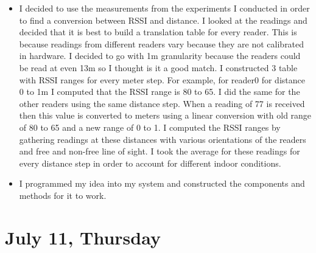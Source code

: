 \documentclass[a4paper,12pt]{article}
\begin{document}
\begin{itemize}
	\item I decided to use the measurements from the experiments I conducted in order to find a conversion between RSSI and distance. I looked at the readings and decided that it is best to build a translation table for every reader. This is because readings from different readers vary because they are not calibrated in hardware. I decided to go with 1m granularity because the readers could be read at even 13m so I thought is it a good match. I constructed 3 table with RSSI ranges for every meter step. For example, for reader0 for distance 0 to 1m I computed that the RSSI range is 80 to 65. I did the same for the other readers using the same distance step. When a reading of 77 is received then this value is converted to meters using a linear conversion with old range of 80 to 65 and a new range of 0 to 1. I computed the RSSI ranges by gathering readings at these distances with various orientations of the readers and free and non-free line of sight. I took the average for these readings for every distance step in order to account for different indoor conditions.
	\item I programmed my idea into my system and constructed the components and methods for it to work.
\end{itemize}

\section{July 11, Thursday}
\end{document}
